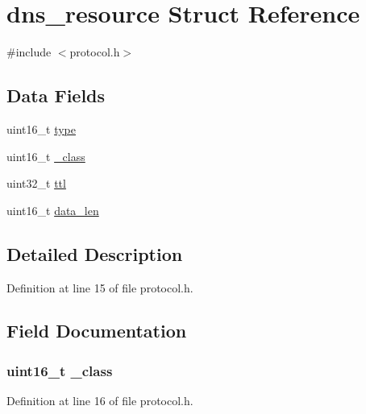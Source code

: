 \hypertarget{structdns__resource}{}\section{dns\+\_\+resource Struct Reference}
\label{structdns__resource}


{\ttfamily \#include $<$protocol.\+h$>$}

\subsection*{Data Fields}
\begin{DoxyCompactItemize}
\item 
uint16\+\_\+t \hyperlink{structdns__resource_acb5cfd209ba75c853d03f701e7f91679}{type}
\item 
uint16\+\_\+t \hyperlink{structdns__resource_a5cbab6ffdacd763a7c1ebe95e4722014}{\+\_\+class}
\item 
uint32\+\_\+t \hyperlink{structdns__resource_a48b9f3382e0929bbd75cda2bf2838126}{ttl}
\item 
uint16\+\_\+t \hyperlink{structdns__resource_ad1a572736a10ff6b282c5f43c4ea1ccf}{data\+\_\+len}
\end{DoxyCompactItemize}


\subsection{Detailed Description}


Definition at line 15 of file protocol.\+h.



\subsection{Field Documentation}
\subsubsection[{\texorpdfstring{\+\_\+class}{_class}}]{\setlength{\rightskip}{0pt plus 5cm}uint16\+\_\+t \+\_\+class}\hypertarget{structdns__resource_a5cbab6ffdacd763a7c1ebe95e4722014}{}\label{structdns__resource_a5cbab6ffdacd763a7c1ebe95e4722014}


Definition at line 16 of file protocol.\+h.

